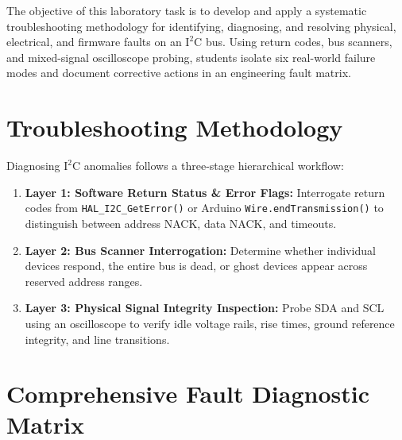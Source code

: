\documentclass[11pt,a4paper]{article}
\begin{document}

\begin{objectivebox}
The objective of this laboratory task is to develop and apply a systematic troubleshooting methodology for identifying, diagnosing, and resolving physical, electrical, and firmware faults on an $\text{I}^2\text{C}$ bus. Using return codes, bus scanners, and mixed-signal oscilloscope probing, students isolate six real-world failure modes and document corrective actions in an engineering fault matrix.
\end{objectivebox}

\section{Troubleshooting Methodology}
Diagnosing $\text{I}^2\text{C}$ anomalies follows a three-stage hierarchical workflow:
\begin{enumerate}
    \item \textbf{Layer 1: Software Return Status \& Error Flags:} Interrogate return codes from \texttt{HAL\_I2C\_GetError()} or Arduino \texttt{Wire.endTransmission()} to distinguish between address NACK, data NACK, and timeouts.
    \item \textbf{Layer 2: Bus Scanner Interrogation:} Determine whether individual devices respond, the entire bus is dead, or ghost devices appear across reserved address ranges.
    \item \textbf{Layer 3: Physical Signal Integrity Inspection:} Probe SDA and SCL using an oscilloscope to verify idle voltage rails, rise times, ground reference integrity, and line transitions.
\end{enumerate}

\section{Comprehensive Fault Diagnostic Matrix}
\end{document}
